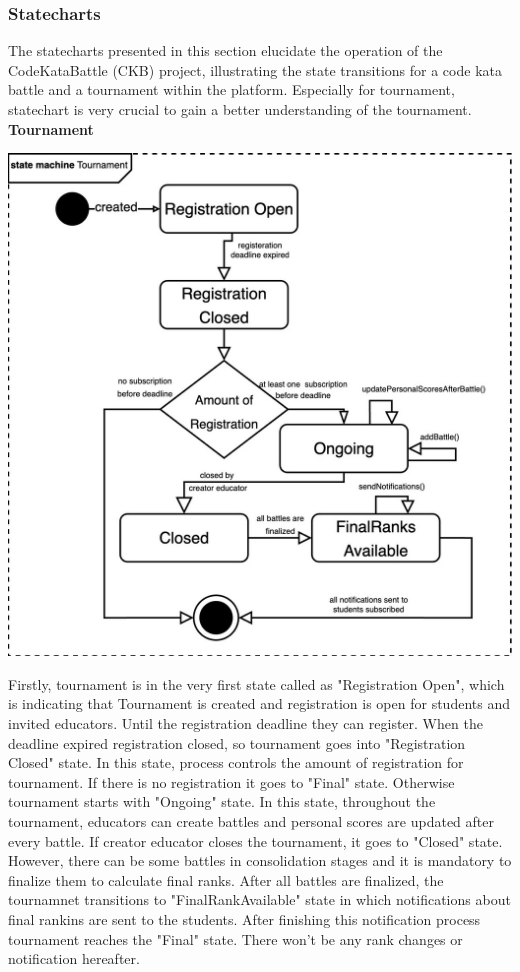 \subsubsection{Statecharts}
The statecharts presented in this section elucidate the operation of the CodeKataBattle (CKB) project, illustrating the state transitions for a code kata battle and a tournament within the platform. Especially for tournament, statechart is very crucial to gain a better understanding of the tournament.\newline
\textbf{Tournament}
\begin{center}
    \includegraphics[scale=0.2]{Images/tournamentStatechart.jpeg}
\end{center}
Firstly, tournament is in the very first state called as "Registration Open", which is indicating that Tournament is created and registration is open for students and invited educators. Until the registration deadline they can register. When the deadline expired registration closed, so tournament goes into "Registration Closed" state. In this state, process controls the amount of registration for tournament. If there is no registration it goes to "Final" state. Otherwise tournament starts with "Ongoing" state. In this state, throughout the tournament, educators can create battles and personal scores are updated after every battle. If creator educator closes the tournament, it goes to "Closed" state. However, there can be some battles in consolidation stages and it is mandatory to finalize them to calculate final ranks. After all battles are finalized, the tournamnet transitions to "FinalRankAvailable" state in which notifications about final rankins are sent to the students. After finishing this notification process tournament reaches the "Final" state. There won't be any rank changes or notification hereafter. \newpage
